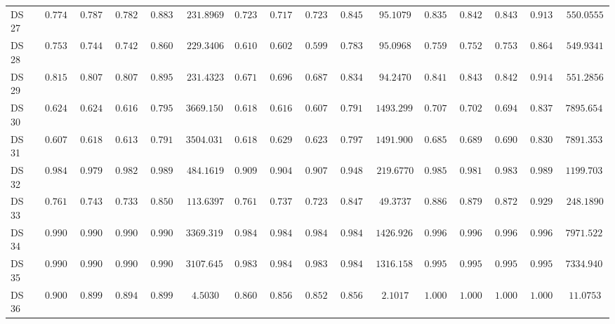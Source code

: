 {\begin{longtable}{|l|ccccc|ccccc|ccccc|}
		DS 27 & $0.7744$ & $0.7872$ & $0.7823$ & $0.8839$ & $231.8969$ & $0.7231$ & $0.7172$ & $0.7232$ & $0.8457$ & $95.1079$ & $\boldsymbol{0.8359}$ & $\boldsymbol{0.8420}$ & $\boldsymbol{0.8437}$ & $\boldsymbol{0.9138}$ & $550.0555$ \\
		DS 28 & $0.7538$ & $0.7447$ & $0.7421$ & $0.8608$ & $229.3406$ & $0.6103$ & $0.6021$ & $0.5992$ & $0.7830$ & $95.0968$ & $\boldsymbol{0.7590}$ & $\boldsymbol{0.7520}$ & $\boldsymbol{0.7532}$ & $\boldsymbol{0.8648}$ & $549.9341$ \\
		DS 29 & $0.8154$ & $0.8077$ & $0.8074$ & $0.8951$ & $231.4323$ & $0.6718$ & $0.6965$ & $0.6873$ & $0.8345$ & $94.2470$ & $\boldsymbol{0.8410}$ & $\boldsymbol{0.8439}$ & $\boldsymbol{0.8425}$ & $\boldsymbol{0.9149}$ & $551.2856$ \\
		DS 30 & $0.6243$ & $0.6241$ & $0.6166$ & $0.7950$ & $3669.1507$ & $0.6188$ & $0.6169$ & $0.6070$ & $0.7910$ & $1493.2991$ & $\boldsymbol{0.7072}$ & $\boldsymbol{0.7023}$ & $\boldsymbol{0.6943}$ & $\boldsymbol{0.8376}$ & $7895.6544$ \\
		DS 31 & $0.6077$ & $0.6183$ & $0.6131$ & $0.7918$ & $3504.0310$ & $0.6188$ & $0.6291$ & $0.6230$ & $0.7977$ & $1491.9005$ & $\boldsymbol{0.6851}$ & $\boldsymbol{0.6894}$ & $\boldsymbol{0.6902}$ & $\boldsymbol{0.8306}$ & $7891.3536$ \\
		DS 32 & $0.9840$ & $0.9795$ & $0.9820$ & $0.9890$ & $484.1619$ & $0.9094$ & $0.9046$ & $0.9074$ & $0.9486$ & $219.6770$ & $\boldsymbol{0.9858}$ & $\boldsymbol{0.9813}$ & $\boldsymbol{0.9833}$ & $\boldsymbol{0.9899}$ & $1199.7035$ \\
		DS 33 & $0.7614$ & $0.7438$ & $0.7330$ & $0.8506$ & $113.6397$ & $0.7614$ & $0.7379$ & $0.7238$ & $0.8471$ & $49.3737$ & $\boldsymbol{0.8864}$ & $\boldsymbol{0.8798}$ & $\boldsymbol{0.8727}$ & $\boldsymbol{0.9299}$ & $248.1890$ \\
		DS 34 & $0.9907$ & $0.9907$ & $0.9907$ & $0.9907$ & $3369.3194$ & $0.9840$ & $0.9843$ & $0.9840$ & $0.9843$ & $1426.9268$ & $\boldsymbol{0.9960}$ & $\boldsymbol{0.9960}$ & $\boldsymbol{0.9960}$ & $\boldsymbol{0.9960}$ & $7971.5222$ \\
		DS 35 & $0.9903$ & $0.9907$ & $0.9902$ & $0.9907$ & $3107.6456$ & $0.9833$ & $0.9844$ & $0.9833$ & $0.9844$ & $1316.1582$ & $\boldsymbol{0.9958}$ & $\boldsymbol{0.9957}$ & $\boldsymbol{0.9958}$ & $\boldsymbol{0.9957}$ & $7334.9400$ \\
		DS 36 & $0.9000$ & $0.8990$ & $0.8949$ & $0.8990$ & $4.5030$ & $0.8600$ & $0.8565$ & $0.8529$ & $0.8565$ & $2.1017$ & $\boldsymbol{1.0000}$ & $\boldsymbol{1.0000}$ & $\boldsymbol{1.0000}$ & $\boldsymbol{1.0000}$ & $11.0753$ \\

\end{longtable}}
